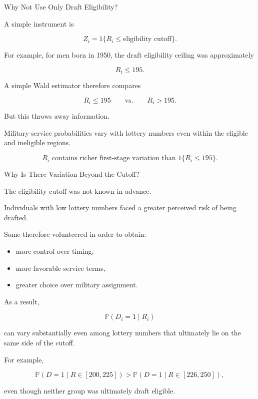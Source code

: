 \documentclass[aspectratio=169]{beamer}
\newcommand{\Prob}{\mathbb{P}}
\begin{document}
\begin{frame}{Why Not Use Only Draft Eligibility?}

A simple instrument is

\[
Z_i
=
1\{R_i \leq \text{eligibility cutoff}\}.
\]

For example, for men born in 1950, the draft eligibility ceiling was approximately

\[
R_i\leq195.
\]

A simple Wald estimator therefore compares

\[
R_i\leq195
\qquad\text{vs.}\qquad
R_i>195.
\]

But this throws away information.

\vspace{0.3cm}

Military-service probabilities vary with lottery numbers even within the eligible and ineligible regions.

\[
\boxed{
R_i
\text{ contains richer first-stage variation than }
1\{R_i\leq195\}.
}
\]

\end{frame}

\begin{frame}{Why Is There Variation Beyond the Cutoff?}

The eligibility cutoff was not known in advance.

Individuals with low lottery numbers faced a greater perceived risk of being drafted.

Some therefore volunteered in order to obtain:

\begin{itemize}
    \item more control over timing,
    \item more favorable service terms,
    \item greater choice over military assignment.
\end{itemize}

As a result,

\[
\Prob(D_i=1\mid R_i)
\]

can vary substantially even among lottery numbers that ultimately lie on the same side of the cutoff.

For example,

\[
\Prob(D=1\mid R\in[200,225])
>
\Prob(D=1\mid R\in[226,250]),
\]

even though neither group was ultimately draft eligible.

\end{frame}
\end{document}
